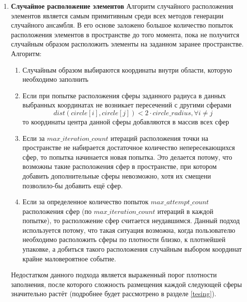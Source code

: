\begin{enumerate}
    \item \label{meth:random_based}
    \textbf{Случайное расположение элементов} 
    \newline
    Алгоритм случайного расположения элементов является самым примитивным среди всех методов генерации случайного ансамбля. В его основе заложено большое количество попыток расположения элементов в пространстве до того момента, пока не получится случайным образом расположить элементы на заданном заранее пространстве.\newline
    Алгоритм:
    \begin{enumerate}[label=\arabic*)]
        \item 
        Случайным образом выбираются координаты внутри области, которую необходимо заполнить
        \item 
        Если при попытке расположения сферы заданного радиуса в данных выбранных координатах не возникает пересечений с другими сферами
        $$dist(circle[i],circle[j])<  2 \cdot circle\_radius, \forall i \neq j$$ то координаты центра данной сферы добавляются в массив всех сфер
        \item 
        Если за $max\_iteration\_count$ итераций расположения точки на пространстве  не набирается достаточное количество  непересекающихся сфер, то попытка начинается новая попытка. Это делается потому, что возможны такие расположения сфер в пространстве, при котором добавить дополнительные сферы невозможно, хотя их смещени позволило-бы добавить ещё сфер.
        \item 
        Если за определенное количество попыток $max\_attempt\_count$ расположения сфер (по $max\_iteration\_count$ итераций в каждой попытке), то расположение сфер считается неудавшимся. Данный подход используется потому, что такая ситуация возможна, когда пользователю необходимо расположить сферы по плотности близко, к плотнейшей упаковке, а добиться такого расположения случайным выбором координат крайне маловероятное событие. 
    \end{enumerate}
    Недостатком данного подхода является выраженный порог плотности заполнения, после которого сложность размещения каждой следующей сферы значительно растёт (подробнее будет рассмотрено в разделе \ref{tesing}).
    \newcommand{\imgsize}{6cm}
    \begin{figure}[h!]
        \begin{subfigure}{0.49\textwidth}
            \centering

\end{subfigure}
\end{figure}
\end{enumerate}
